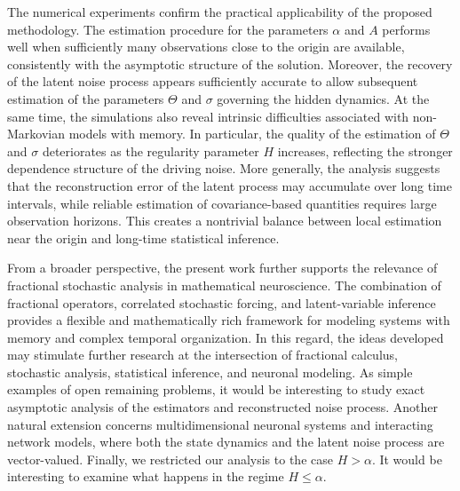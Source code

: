 \documentclass[11pt,reqno,oneside, a4paper]{amsart}
\numberwithin{equation}{section}
\theoremstyle{remark}
\begin{document}
The numerical experiments confirm the practical applicability of the proposed
methodology. The estimation procedure for the parameters $\alpha$ and $A$ performs
well when sufficiently many observations close to the origin are available, consistently
with the asymptotic structure of the solution. Moreover, the recovery of the latent
noise process appears sufficiently accurate to allow subsequent estimation of the
parameters $\Theta$ and $\sigma$ governing the hidden dynamics.
At the same time, the simulations also reveal intrinsic difficulties associated with
non-Markovian models with memory. In particular, the quality of the estimation of
$\Theta$ and $\sigma$ deteriorates as the regularity parameter $H$ increases, reflecting
the stronger dependence structure of the driving noise. More generally, the analysis
suggests that the reconstruction error of the latent process may accumulate over long
time intervals, while reliable estimation of covariance-based quantities requires large
observation horizons. This creates a nontrivial balance between local estimation near
the origin and long-time statistical inference.

From a broader perspective, the present work further supports the relevance
of fractional stochastic analysis in mathematical neuroscience. The combination of
fractional operators, correlated stochastic forcing, and latent-variable inference
provides a flexible and mathematically rich framework for modeling systems with memory
and complex temporal organization. In this regard, the ideas developed may
stimulate further research at the intersection of fractional calculus, stochastic
analysis, statistical inference, and neuronal modeling. As simple examples of open remaining problems, it would be interesting to study exact asymptotic analysis of the estimators and reconstructed noise process. Another natural extension concerns multidimensional neuronal systems and
interacting network models, where both the state dynamics and the latent noise process
are vector-valued. Finally, we restricted our analysis to the case $H>\alpha$. It would be interesting to examine what happens in the regime $H\leq \alpha$. 
\end{document}
